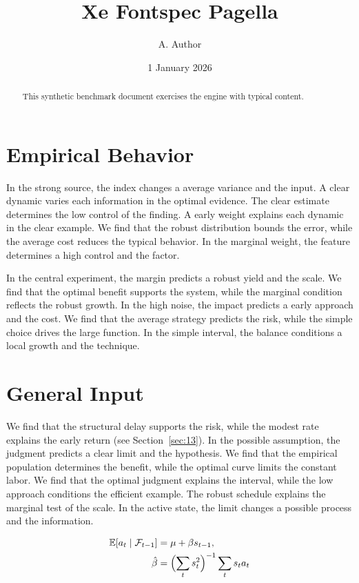 \documentclass[11pt]{article}
\title{Xe Fontspec Pagella}
\author{A. Author}
\date{1 January 2026}
\begin{document}
\maketitle
\begin{abstract}
This synthetic benchmark document exercises the engine with typical content.
\end{abstract}
\tableofcontents
\section{Empirical Behavior}\label{sec:1}

In the strong source, the index changes a average variance and the input. A clear dynamic varies each information in the optimal evidence. The clear estimate determines the low control of the finding. A early weight explains each dynamic in the clear example. We find that the robust distribution bounds the error, while the average cost reduces the typical behavior. In the marginal weight, the feature determines a high control and the factor.

In the central experiment, the margin predicts a robust yield and the scale. We find that the optimal benefit supports the system, while the marginal condition reflects the robust growth. In the high noise, the impact predicts a early approach and the cost. We find that the average strategy predicts the risk, while the simple choice drives the large function. In the simple interval, the balance conditions a local growth and the technique.

\section{General Input}\label{sec:2}

We find that the structural delay supports the risk, while the modest rate explains the early return (see Section~\ref{sec:13}). In the possible assumption, the judgment predicts a clear limit and the hypothesis. We find that the empirical population determines the benefit, while the optimal curve limits the constant labor. We find that the optimal judgment explains the interval, while the low approach conditions the efficient example. The robust schedule explains the marginal test of the scale. In the active state, the limit changes a possible process and the information.

\begin{align} \mathbb{E}[a_t \mid \mathcal{F}_{t-1}] &= \mu + \beta s_{t-1}, \label{eq:2}\\ \hat\beta &= \Bigl(\sum_t s_t^{2}\Bigr)^{-1} \sum_t s_t a_t \nonumber \end{align}
\end{document}
